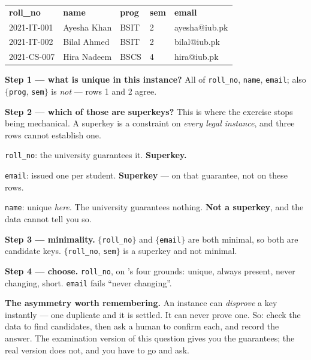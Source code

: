 \begin{worked}
\begin{tabular}{@{}L{2.8cm}L{2.6cm}L{2.2cm}L{2.0cm}L{2.4cm}@{}}
\textbf{roll\_no} & \textbf{name} & \textbf{prog} & \textbf{sem}
& \textbf{email} \\
2021-IT-001 & Ayesha Khan & BSIT & 2 & ayesha@iub.pk \\
2021-IT-002 & Bilal Ahmed & BSIT & 2 & bilal@iub.pk \\
2021-CS-007 & Hira Nadeem & BSCS & 4 & hira@iub.pk \\
\end{tabular}

\medskip
\textbf{Step 1 --- what is unique in this instance?} All of
\texttt{roll\_no}, \texttt{name}, \texttt{email}; also
$\{$\texttt{prog}, \texttt{sem}$\}$ is \emph{not} --- rows 1 and 2 agree.

\medskip
\textbf{Step 2 --- which of those are superkeys?} This is where the exercise
stops being mechanical. A superkey is a constraint on \emph{every legal
instance}, and three rows cannot establish one.
\begin{tight}
  \item \texttt{roll\_no}: the university guarantees it. \textbf{Superkey.}
  \item \texttt{email}: issued one per student. \textbf{Superkey} --- on that
        guarantee, not on these rows.
  \item \texttt{name}: unique \emph{here}. The university guarantees nothing.
        \textbf{Not a superkey}, and the data cannot tell you so.
\end{tight}

\medskip
\textbf{Step 3 --- minimality.} $\{$\texttt{roll\_no}$\}$ and
$\{$\texttt{email}$\}$ are both minimal, so both are candidate keys.
$\{$\texttt{roll\_no}, \texttt{sem}$\}$ is a superkey and not minimal.

\medskip
\textbf{Step 4 --- choose.} \texttt{roll\_no}, on 's four
grounds: unique, always present, never changing, short. \texttt{email} fails
``never changing''.

\medskip
\textbf{The asymmetry worth remembering.} An instance can \emph{disprove} a key
instantly --- one duplicate and it is settled. It can never prove one. So:
check the data to find candidates, then ask a human to confirm each, and
record the answer. The examination version of this question gives you the
guarantees; the real version does not, and you have to go and ask.
\end{worked}

